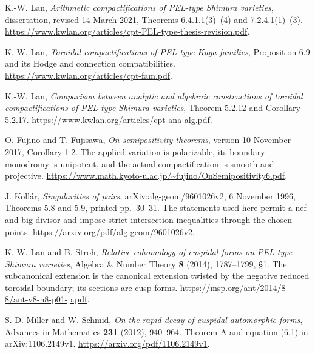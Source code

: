K.-W. Lan, \emph{Arithmetic compactifications of PEL-type Shimura
varieties}, dissertation, revised 14 March 2021,
Theorems 6.4.1.1(3)--(4) and 7.2.4.1(1)--(3).
\url{https://www.kwlan.org/articles/cpt-PEL-type-thesis-revision.pdf}.

K.-W. Lan, \emph{Toroidal compactifications of PEL-type Kuga families},
Proposition 6.9 and its Hodge and connection compatibilities.
\url{https://www.kwlan.org/articles/cpt-fam.pdf}.

K.-W. Lan, \emph{Comparison between analytic and algebraic
constructions of toroidal compactifications of PEL-type Shimura
varieties}, Theorem 5.2.12 and Corollary 5.2.17.
\url{https://www.kwlan.org/articles/cpt-ana-alg.pdf}.

O. Fujino and T. Fujisawa, \emph{On semipositivity theorems},
version 10 November 2017, Corollary 1.2.
The applied variation is polarizable, its boundary monodromy is
unipotent, and the actual compactification is smooth and projective.
\url{https://www.math.kyoto-u.ac.jp/~fujino/OnSemipositivity6.pdf}.

J. Koll\'ar, \emph{Singularities of pairs}, arXiv:alg-geom/9601026v2,
6 November 1996, Theorems 5.8 and 5.9, printed pp.\ 30--31.
The statements used here permit a nef and big divisor and impose
strict intersection inequalities through the chosen points.
\url{https://arxiv.org/pdf/alg-geom/9601026v2}.

K.-W. Lan and B. Stroh, \emph{Relative cohomology of cuspidal
forms on PEL-type Shimura varieties},
Algebra \& Number Theory \textbf{8} (2014), 1787--1799, \S1.
The subcanonical extension is the canonical extension twisted
by the negative reduced toroidal boundary; its sections are cusp forms.
\url{https://msp.org/ant/2014/8-8/ant-v8-n8-p01-p.pdf}.

S. D. Miller and W. Schmid, \emph{On the rapid decay of cuspidal
automorphic forms}, Advances in Mathematics \textbf{231} (2012),
940--964. Theorem A and equation (6.1) in arXiv:1106.2149v1.
\url{https://arxiv.org/pdf/1106.2149v1}.
